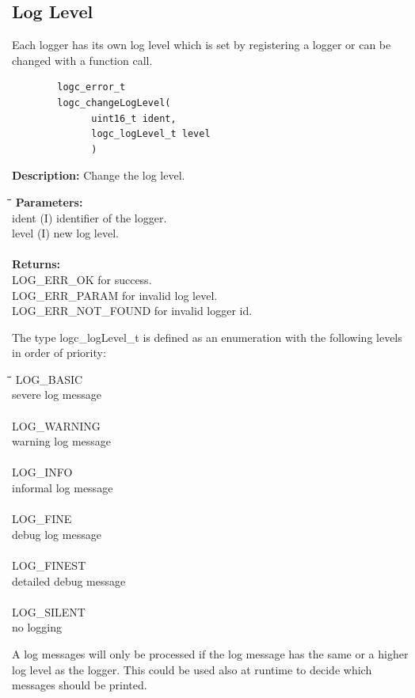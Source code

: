 \documentclass[a4paper, titlepage, 11pt]{article}
\begin{document}
\newpage

\subsection{Log Level}
Each logger has its own log level which is set by registering a logger or can be changed with a function call.
\small
\begin{verbatim}
        logc_error_t
        logc_changeLogLevel(
              uint16_t ident,
              logc_logLevel_t level
              )
\end{verbatim}
\normalsize
\textbf{Description:} Change the log level.
\begin{tabbing}
\hspace*{1cm}\=\hspace*{2cm}\=\hspace*{0,6cm}\= \kill
\textbf{Parameters:} \\
\> ident \> (I) identifier of the logger. \\
\> level \> (I) new log level. \\ \\
\textbf{Returns:} \\
\> LOG\_ERR\_OK for success. \\
\> LOG\_ERR\_PARAM for invalid log level. \\
\> LOG\_ERR\_NOT\_FOUND for invalid logger id. \\
\end{tabbing}
The type logc\_logLevel\_t is defined as an enumeration with the following levels in order of priority:
\begin{tabbing}
\hspace*{1cm}\=\hspace*{2cm}\=\hspace*{0,6cm}\= \kill
\> LOG\_BASIC \\
\> severe log message \\ \\
\> LOG\_WARNING \\
\> warning log message \\ \\
\> LOG\_INFO \\
\> informal log message \\ \\
\> LOG\_FINE \\
\> debug log message \\ \\
\> LOG\_FINEST \\
\> detailed debug message \\ \\
\> LOG\_SILENT \\
\> no logging \\
\end{tabbing}
A log messages will only be processed if the log message has the same or a higher log level as the logger. This could be used also at runtime to decide which messages should be printed.
\end{document}

